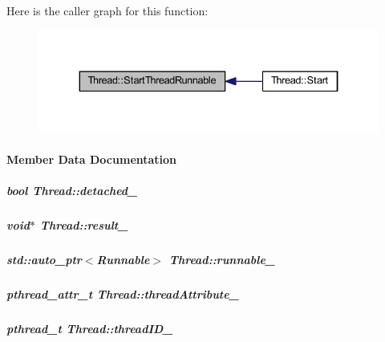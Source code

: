 Here is the caller graph for this function\-:
\nopagebreak
\begin{figure}[H]
\begin{center}
\leavevmode
\includegraphics[width=334pt]{group___core_a215c9e3a0965e061e7d36aa5adfe4791_icgraph}
\end{center}
\end{figure}




\paragraph{Member Data Documentation}
\hypertarget{group___core_a2b6b46b7eb56cffef7d0722649956c5d}{
\subparagraph[{detached\-\_\-}]{\setlength{\rightskip}{0pt plus 5cm}bool Thread\-::detached\-\_\-\hspace{0.3cm}{\ttfamily [private]}}}\label{group___core_a2b6b46b7eb56cffef7d0722649956c5d}
\hypertarget{group___core_a56c923629f0131b37a2b8c1f74a1e2b0}{
\subparagraph[{result\-\_\-}]{\setlength{\rightskip}{0pt plus 5cm}void$\ast$ Thread\-::result\-\_\-\hspace{0.3cm}{\ttfamily [private]}}}\label{group___core_a56c923629f0131b37a2b8c1f74a1e2b0}
\hypertarget{group___core_a4e2c7c71f666a7c4404f8fc03a57f2d7}{
\subparagraph[{runnable\-\_\-}]{\setlength{\rightskip}{0pt plus 5cm}std\-::auto\-\_\-ptr$<${\bf Runnable}$>$ Thread\-::runnable\-\_\-\hspace{0.3cm}{\ttfamily [private]}}}\label{group___core_a4e2c7c71f666a7c4404f8fc03a57f2d7}
\hypertarget{group___core_a2fbeb3f285f074698a3323bfdd7e5d2a}{
\subparagraph[{thread\-Attribute\-\_\-}]{\setlength{\rightskip}{0pt plus 5cm}pthread\-\_\-attr\-\_\-t Thread\-::thread\-Attribute\-\_\-\hspace{0.3cm}{\ttfamily [private]}}}\label{group___core_a2fbeb3f285f074698a3323bfdd7e5d2a}
\hypertarget{group___core_a8a7056f4641e224b016506ec0fc1078b}{
\subparagraph[{thread\-I\-D\-\_\-}]{\setlength{\rightskip}{0pt plus 5cm}pthread\-\_\-t Thread\-::thread\-I\-D\-\_\-\hspace{0.3cm}{\ttfamily [private]}}}\label{group___core_a8a7056f4641e224b016506ec0fc1078b}
\label{class_visualizer}
\hypertarget{group___core_class_visualizer}{}
